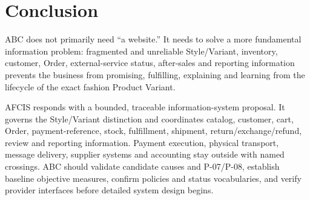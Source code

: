 \documentclass[10pt,a4paper]{article}
\begin{document}
\section{Conclusion}
ABC does not primarily need ``a website.'' It needs to solve a more fundamental information problem: fragmented and unreliable Style/Variant, inventory, customer, Order, external-service status, after-sales and reporting information prevents the business from promising, fulfilling, explaining and learning from the lifecycle of the exact fashion Product Variant.

AFCIS responds with a bounded, traceable information-system proposal. It governs the Style/Variant distinction and coordinates catalog, customer, cart, Order, payment-reference, stock, fulfillment, shipment, return/exchange/refund, review and reporting information. Payment execution, physical transport, message delivery, supplier systems and accounting stay outside with named crossings. ABC should validate candidate causes and P-07/P-08, establish baseline objective measures, confirm policies and status vocabularies, and verify provider interfaces before detailed system design begins.
\end{document}
